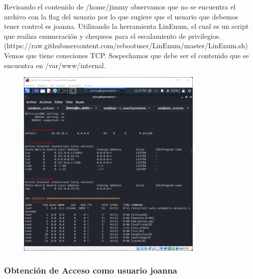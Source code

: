 \documentclass{article}
\begin{document}
Revisando el contenido de /home/jimmy observamos que no se encuentra el archivo con la flag del usuario por lo que sugiere que el usuario que debemos tener control es joanna.
Utilizando la herramienta LinEnum, el cual es un script que realiza enumeración y chequeos para el escalamiento de privilegios. (https://raw.githubusercontent.com/rebootuser/LinEnum/master/LinEnum.sh) Vemos que tiene coneciones TCP. Sospechamos que debe ser el contenido que se encuentra en /var/www/internal.
\begin{figure}[h]
	\center
	\includegraphics[width=0.8\textwidth]{images/openadmin/11-tcp.png}
	\caption{}
\end{figure}

\subsubsection{Obtención de Acceso como usuario joanna}
\end{document}
